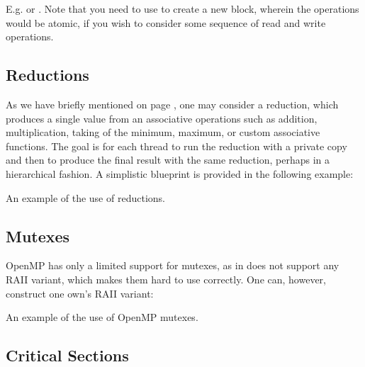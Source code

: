 E.g.  or .
Note that you need to use \cpp{{}} to create a new block, wherein the operations would be atomic, if you wish to consider some sequence of read and write operations. 

\subsection{Reductions}

As we have briefly mentioned on page \pageref{sec:reduction1}, one may consider a reduction, which produces a single value from an associative operations such as addition, multiplication, taking of the minimum, maximum, or custom associative functions. The goal is for each thread to run the reduction with a private copy and then to produce the final result with the same reduction, perhaps in a hierarchical fashion. A simplistic blueprint is provided in the following example:

\raggedbottom
\begin{codebox}[]{\href{https://godbolt.org/z/orfM3x13M}{\ExternalLink}}
\footnotesize An example of the use of reductions.
\tcblower
{}
\end{codebox}

\subsection{Mutexes}

OpenMP has only a limited support for mutexes, as in does not support any RAII variant, 
which makes them hard to use correctly. One can, however, construct one own's RAII variant:


\raggedbottom
\begin{codebox}[]{\href{https://godbolt.org/z/vnsW7v35z}{\ExternalLink}}
\footnotesize An example of the use of OpenMP mutexes.
\tcblower
{}
\end{codebox}

\subsection{Critical Sections}

